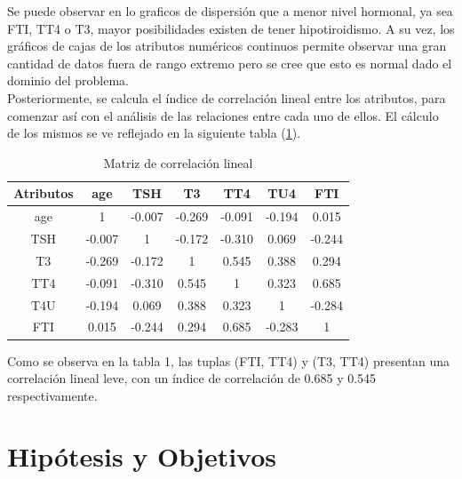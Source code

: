 \documentclass[osajnl,twocolumn,showpacs,superscriptaddress,10pt,floatfix]{revtex4-1} %
\begin{document}
Se puede observar en lo graficos de dispersión que a menor nivel hormonal, ya sea FTI, TT4 o T3, mayor posibilidades existen de tener hipotiroidismo. A su vez, los gráficos de cajas de los atributos numéricos continuos permite observar una gran cantidad de datos fuera de rango extremo pero se cree que esto es normal dado el dominio del problema. \\

Posteriormente, se calcula el índice de correlación lineal entre los atributos, para comenzar así con el análisis de las relaciones entre cada uno de ellos. El cálculo de los mismos se ve reflejado en la siguiente tabla (\ref{table:correlation_matrix}). \\

\begin{table}[h!]
    \centering
    \begin{tabular}{ccccccc}

        Atributos & age & TSH & T3 & TT4 & TU4 & FTI \\
        \hline
        age & 1 & -0.007 & -0.269 & -0.091 & -0.194 & 0.015 \\

        TSH & -0.007 & 1 & -0.172 & -0.310 & 0.069 & -0.244 \\

        T3 & -0.269 & -0.172 & 1 & 0.545 & 0.388 & 0.294 \\

        TT4 & -0.091 & -0.310 & 0.545 & 1 & 0.323 & 0.685 \\

        T4U & -0.194 & 0.069 & 0.388 & 0.323 & 1 & -0.284 \\

        FTI & 0.015 & -0.244 & 0.294 & 0.685 & -0.283 & 1 \\
        \hline
    \end{tabular}
    \caption{Matriz de correlación lineal}
    \label{table:correlation_matrix}
\end{table}

Como se observa en la tabla 1, las tuplas (FTI, TT4) y (T3, TT4) presentan una correlación lineal leve, con un índice de correlación de 0.685 y 0.545 respectivamente. \\

\section{Hipótesis y Objetivos}
\end{document}
